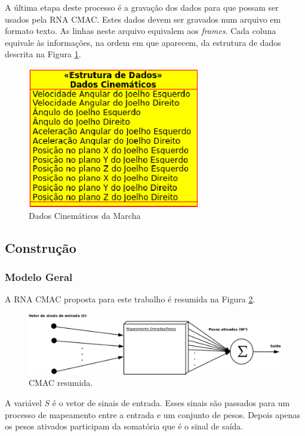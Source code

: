 A última etapa deste processo é a gravação dos dados para que possam ser usados pela RNA CMAC. 
Estes dados devem ser gravados num arquivo em formato texto. 
As linhas neste arquivo equivalem aos \emph{frames}. 
Cada coluna equivale às informações, na ordem em que aparecem, da estrutura de dados descrita na Figura \ref{dados_cinematicos}. 
\begin{figure}[ht]
	\centering
	\includegraphics[width=7.5cm]{figuras/dados_cinematicos.eps}
	\caption{Dados Cinemáticos da Marcha}
	\label{dados_cinematicos}
\end{figure}

\subsection[Construção de uma RNA CMAC]{\textbf{Construção}}
\subsubsection{Modelo Geral}

A RNA CMAC proposta para este trabalho é resumida na Figura \ref{camac_resumida}.

\begin{figure}[ht]
	\centering
	\includegraphics[width=15cm]{figuras/cmac_resumida.eps}
	\caption{CMAC resumida.}
	\label{camac_resumida}
\end{figure}

A variável $S$ é o vetor de sinais de entrada. 
Esses sinais são passados para um processo de mapeamento entre a entrada e um conjunto de pesos. 
Depois apenas os pesos ativados participam da somatória que é o sinal de saída. 

